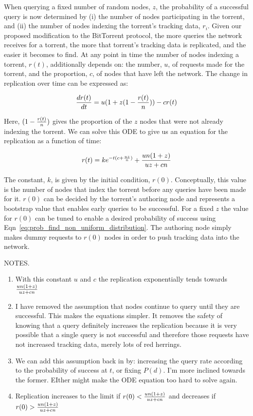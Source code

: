     When querying a fixed number of random nodes, $z$, the probability of a successful query is now determined by (i) the number of nodes participating in the torrent, and (ii) the number of nodes indexing the torrent's tracking data, $r_i$. Given our proposed modification to the BitTorrent protocol, the more queries the network receives for a torrent, the more that torrent's tracking data is replicated, and the easier it becomes to find. At any point in time the number of nodes indexing a torrent, $r(t)$, additionally depends on: the number, $u$, of requests made for the torrent, and the proportion, $c$, of nodes that have left the network. The change in replication over time can be expressed as:

    \begin{equation}
        {dr(t) \over dt} = u(1+z(1-{r(t) \over n}))-cr(t)
        \label{eq:drdt}
    \end{equation}

    Here, $(1-{r(t) \over n})$ gives the proportion of the $z$ nodes that were not already indexing the torrent. We can solve this ODE to give us an equation for the replication as a function of time:

    \begin{equation}
        r(t) = ke^{-t(c+{uz \over n})}+{un(1+z) \over uz+cn}
        \label{eq:rt}
    \end{equation}    

    The constant, $k$, is given by the initial condition, $r(0)$. Conceptually, this value is the number of nodes that index the torrent before any queries have been made for it. $r(0)$ can be decided by the torrent's authoring node and represents a bootstrap value that enables early queries to be successful. For a fixed $z$ the value for $r(0)$ can be tuned to enable a desired probability of success using Eqn~\ref{eq:prob_find_non_uniform_distribution}. The authoring node simply makes dummy requests to $r(0)$ nodes in order to push tracking data into the network.

    NOTES.

    \begin{enumerate}
        \item With this constant $u$ and $c$ the replication exponentially tends towards ${un(1+z) \over uz+cn}$
        \item I have removed the assumption that nodes continue to query until they are successful. This makes the equations simpler. It removes the safety of knowing that a query definitely increases the replication because it is very possible that a single query is not successful and therefore those requests have not increased tracking data, merely lots of red herrings.
        \item We can add this assumption back in by: increasing the query rate according to the probability of success at $t$, or fixing $P(d)$. I'm more inclined towards the former. EIther might make the ODE equation too hard to solve again.
        \item Replication increases to the limit if $r(0) < {un(1+z) \over uz+cn}$ and decreases if $r(0) > {un(1+z) \over uz+cn}$
    \end{enumerate}

